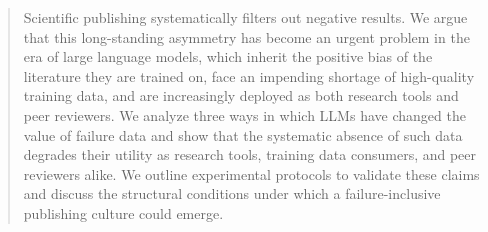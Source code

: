 \begin{abstract}
Scientific publishing systematically filters out negative results.
We argue that this long-standing asymmetry has become an urgent
problem in the era of large language models, which inherit the
positive bias of the literature they are trained on, face an
impending shortage of high-quality training data, and are
increasingly deployed as both research tools and peer reviewers. We
analyze three ways in which LLMs have changed the value of failure
data and show that the systematic absence of such data degrades
their utility as research tools, training data consumers, and peer
reviewers alike. We outline experimental protocols to validate
these claims and discuss the structural conditions under which a
failure-inclusive publishing culture could emerge.
\end{abstract}
 
